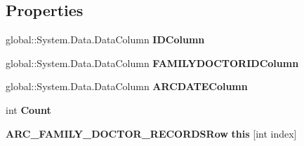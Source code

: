 \subsection*{Properties}
\begin{CompactItemize}
\item 
global::System.Data.DataColumn \textbf{IDColumn}\hspace{0.3cm}{\tt  [get]}\label{class_automatic_medical_system_1_1_data_set2_1_1_a_r_c___f_a_m_i_l_y___d_o_c_t_o_r___r_e_c_o_r_d_s_data_table_7120cad40001ed3b081916655cd09af2}

\item 
global::System.Data.DataColumn \textbf{FAMILYDOCTORIDColumn}\hspace{0.3cm}{\tt  [get]}\label{class_automatic_medical_system_1_1_data_set2_1_1_a_r_c___f_a_m_i_l_y___d_o_c_t_o_r___r_e_c_o_r_d_s_data_table_e55916429f3b714cbfd6184cf6082fbb}

\item 
global::System.Data.DataColumn \textbf{ARCDATEColumn}\hspace{0.3cm}{\tt  [get]}\label{class_automatic_medical_system_1_1_data_set2_1_1_a_r_c___f_a_m_i_l_y___d_o_c_t_o_r___r_e_c_o_r_d_s_data_table_54845b4152644e02b337464ae49b551b}

\item 
int \textbf{Count}\hspace{0.3cm}{\tt  [get]}\label{class_automatic_medical_system_1_1_data_set2_1_1_a_r_c___f_a_m_i_l_y___d_o_c_t_o_r___r_e_c_o_r_d_s_data_table_e81fa0c2406b65a6c1602cea7018f9d7}

\item 
{\bf ARC\_\-FAMILY\_\-DOCTOR\_\-RECORDSRow} \textbf{this} [int index]\hspace{0.3cm}{\tt  [get]}\label{class_automatic_medical_system_1_1_data_set2_1_1_a_r_c___f_a_m_i_l_y___d_o_c_t_o_r___r_e_c_o_r_d_s_data_table_46e4c422820f8f3860b2ff08205ac79d}

\end{CompactItemize}
